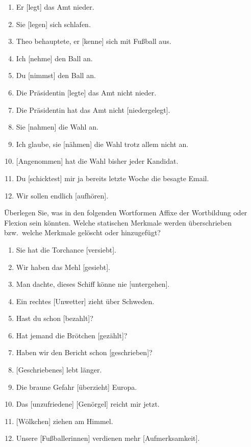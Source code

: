 \begin{enumerate}\Lf
  \item Er {[legt]} das Amt nieder.
  \item Sie {[legen]} sich schlafen.
  \item Theo behauptete, er {[kenne]} sich mit Fußball aus.
  \item Ich {[nehme]} den Ball an.
  \item Du {[nimmst]} den Ball an.
  \item Die Präsidentin {[legte]} das Amt nicht nieder.
  \item Die Präsidentin hat das Amt nicht {[niedergelegt]}.
  \item Sie {[nahmen]} die Wahl an.
  \item Ich glaube, sie {[nähmen]} die Wahl trotz allem nicht an.
  \item {[Angenommen]} hat die Wahl bisher jeder Kandidat.
  \item Du {[schicktest]} mir ja bereits letzte Woche die besagte Email.
  \item Wir sollen endlich {[aufhören]}.
\end{enumerate}

\Uebung[\twostar] \label{u63} Überlegen Sie, was in den folgenden Wortformen Affixe der Wortbildung oder Flexion sein könnten.
Welche statischen Merkmale werden überschrieben bzw.\ welche Merkmale gelöscht oder hinzugefügt?

\begin{enumerate}\Lf
  \item Sie hat die Torchance {[versiebt]}.
  \item Wir haben das Mehl {[gesiebt]}.
  \item Man dachte, dieses Schiff könne nie {[untergehen]}.
  \item Ein rechtes {[Unwetter]} zieht über Schweden.
  \item Hast du schon {[bezahlt]}?
  \item Hat jemand die Brötchen {[gezählt]}?
  \item Haben wir den Bericht schon {[geschrieben]}?
  \item {[Geschriebenes]} lebt länger.
  \item Die braune Gefahr {[überzieht]} Europa.
  \item Das {[unzufriedene]} {[Genörgel]} reicht mir jetzt.
  \item {[Wölkchen]} ziehen am Himmel.
  \item Unsere {[Fußballerinnen]} verdienen mehr {[Aufmerksamkeit]}.
\end{enumerate}

